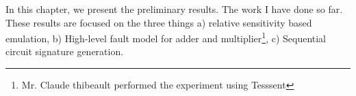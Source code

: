 

In this chapter, we present the preliminary results. The work I have done so far. These results are focused on the three things a) relative sensitivity based emulation, b) High-level fault model for adder and multiplier\footnote{Mr. Claude thibeault performed the experiment using Tesssent }, c) Sequential circuit signature generation.





\label{preliminary}
